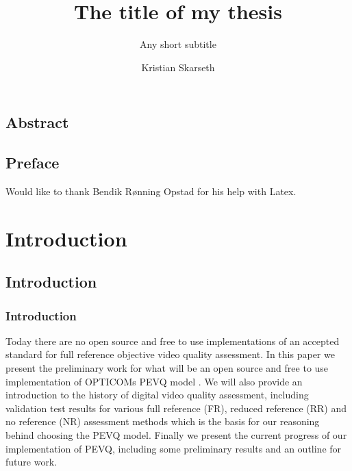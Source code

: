 




\title{The title of my thesis}       
\subtitle{Any short subtitle}        
\author{Kristian Skarseth}  


\ififorside{}
\frontmatter{}
\maketitle{}
\listoftodos
\chapter*{Abstract}                  

\tableofcontents{}
\listoffigures{}
\listoftables{}
\listofcodelistings

\chapter*{Preface}                  
Would like to thank Bendik Rønning Opstad for his help with Latex. 
\mainmatter{}

\part{Introduction}        
           
\chapter{Introduction}\label{chap:intro}

\section{Introduction}\label{sect:intro}
Today there are no open source and free to use implementations of an accepted standard for full reference objective video quality assessment. In this paper we present the preliminary work for what will be an open source and free to use implementation of OPTICOMs PEVQ model \cite{j.247}. We will also provide an introduction to the history of digital video quality assessment, including validation test results for various full reference (FR), reduced reference (RR) and no reference (NR) assessment methods which is the basis for our reasoning behind choosing the PEVQ model. Finally we present the current progress of our implementation of PEVQ, including some preliminary results and an outline for future work.


